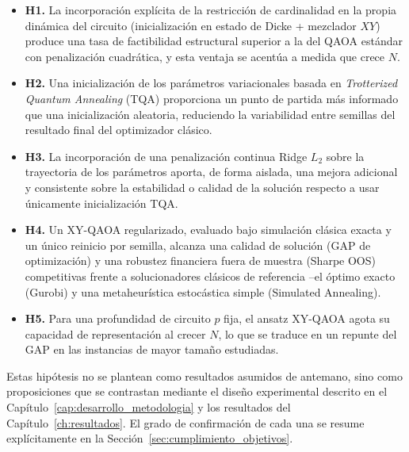 \begin{itemize}
    \item \textbf{H1.} La incorporación explícita de la restricción de cardinalidad en la
    propia dinámica del circuito (inicialización en estado de Dicke + mezclador $XY$)
    produce una tasa de factibilidad estructural superior a la del QAOA estándar con
    penalización cuadrática, y esta ventaja se acentúa a medida que crece $N$.

    \item \textbf{H2.} Una inicialización de los parámetros variacionales basada en
    \textit{Trotterized Quantum Annealing} (TQA) proporciona un punto de partida más
    informado que una inicialización aleatoria, reduciendo la variabilidad entre semillas
    del resultado final del optimizador clásico.

    \item \textbf{H3.} La incorporación de una penalización continua Ridge $L_2$ sobre la
    trayectoria de los parámetros aporta, de forma aislada, una mejora adicional y
    consistente sobre la estabilidad o calidad de la solución respecto a usar únicamente
    inicialización TQA.

    \item \textbf{H4.} Un XY-QAOA regularizado, evaluado bajo simulación clásica exacta y
    un único reinicio por semilla, alcanza una calidad de solución (GAP de optimización) y
    una robustez financiera fuera de muestra (Sharpe OOS) competitivas frente a
    solucionadores clásicos de referencia --el óptimo exacto (Gurobi) y una metaheurística
    estocástica simple (Simulated Annealing).

    \item \textbf{H5.} Para una profundidad de circuito $p$ fija, el ansatz XY-QAOA agota
    su capacidad de representación al crecer $N$, lo que se traduce en un repunte del GAP
    en las instancias de mayor tamaño estudiadas.
\end{itemize}

Estas hipótesis no se plantean como resultados asumidos de antemano, sino como
proposiciones que se contrastan mediante el diseño experimental descrito en el
Capítulo~\ref{cap:desarrollo_metodologia} y los resultados del Capítulo~\ref{ch:resultados}. El grado
de confirmación de cada una se resume explícitamente en la
Sección~\ref{sec:cumplimiento_objetivos}.

